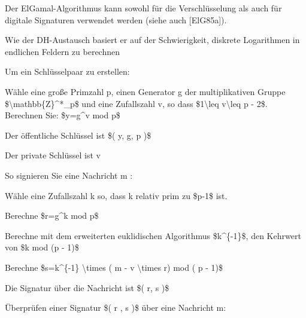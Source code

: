 \documentclass[a4paper]{article}
\begin{document}
\begin{multicols}{3}
      \begin{itemize*}
            \item
            Der ElGamal-Algorithmus kann sowohl für die Verschlüsselung als auch
            für digitale Signaturen verwendet werden (siehe auch {[}ElG85a{]}).
            \item
            Wie der DH-Austausch basiert er auf der Schwierigkeit, diskrete
            Logarithmen in endlichen Feldern zu berechnen
            \item
            Um ein Schlüsselpaar zu erstellen:

            \begin{itemize*}
                  \item Wähle eine große Primzahl p, einen Generator g der multiplikativen Gruppe \$\textbackslash mathbb\{Z\}\^{}*\_p\$ und eine Zufallszahl v, so dass \$1\textbackslash leq v\textbackslash leq p - 2\$. Berechnen Sie: \$y=g\^{}v mod p\$
                  \item Der öffentliche Schlüssel ist \$( y, g, p )\$
                  \item Der private Schlüssel ist v
            \end{itemize*}
            \item
            So signieren Sie eine Nachricht m :

            \begin{itemize*}
                  \item Wähle eine Zufallszahl k so, dass k relativ prim zu \$p-1\$ ist.
                  \item Berechne \$r=g\^{}k mod p\$
                  \item Berechne mit dem erweiterten euklidischen Algorithmus \$k\^{}\{-1\}\$, den Kehrwert von \$k mod (p - 1)\$
                  \item Berechne \$s=k\^{}\{-1\} \textbackslash times ( m - v \textbackslash times r) mod ( p - 1)\$
                  \item Die Signatur über die Nachricht ist \$( r, s )\$
            \end{itemize*}
            \item
            Überprüfen einer Signatur \$( r , s )\$ über eine Nachricht m:


\end{itemize*}
\end{multicols}
\end{document}
